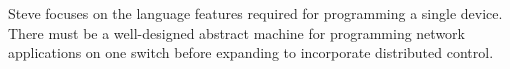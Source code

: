 %
%
%
%
%


Steve focuses on the language features required for programming a single device. There must be a well-designed abstract machine for programming network applications on one switch before expanding to incorporate distributed control.

